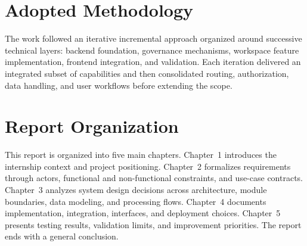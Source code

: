 \section*{Adopted Methodology}
The work followed an iterative incremental approach organized around successive
technical layers: backend foundation, governance mechanisms, workspace feature
implementation, frontend integration, and validation. Each iteration delivered
an integrated subset of capabilities and then consolidated routing,
authorization, data handling, and user workflows before extending the scope.

\section*{Report Organization}
This report is organized into five main chapters. Chapter~1 introduces the
internship context and project positioning. Chapter~2 formalizes requirements
through actors, functional and non-functional constraints, and use-case
contracts. Chapter~3 analyzes system design decisions across architecture,
module boundaries, data modeling, and processing flows. Chapter~4 documents
implementation, integration, interfaces, and deployment choices. Chapter~5
presents testing results, validation limits, and improvement priorities. The
report ends with a general conclusion.

